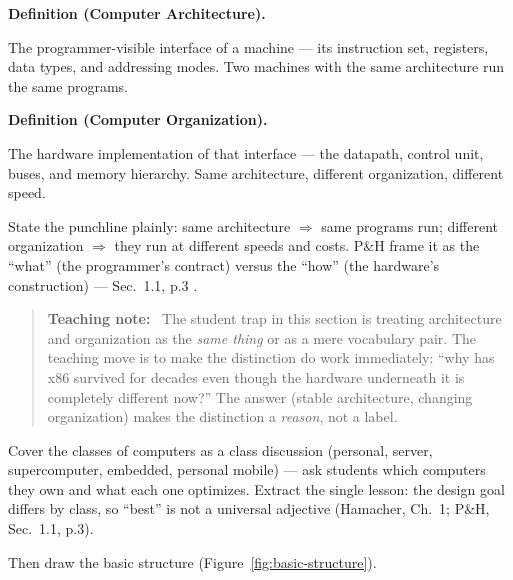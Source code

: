 \documentclass[11pt]{article}
\newenvironment{definitionbox}[1]{%
  \par\noindent\textbf{Definition (#1).}\ \itshape
}{\par\vspace{0.3em}}
\newenvironment{teachingaside}{\begin{quote}\small\color{primary-gold}\textbf{Teaching note:}\ }{\end{quote}}
\begin{document}
\begin{definitionbox}{Computer Architecture}
The programmer-visible interface of a machine --- its instruction set, registers, data types, and addressing modes. Two machines with the same architecture run the same programs.
\end{definitionbox}

\begin{definitionbox}{Computer Organization}
The hardware implementation of that interface --- the datapath, control unit, buses, and memory hierarchy. Same architecture, different organization, different speed.
\end{definitionbox}

State the punchline plainly: same architecture $\Rightarrow$ same programs run; different organization $\Rightarrow$ they run at different speeds and costs. P\&H frame it as the ``what'' (the programmer's contract) versus the ``how'' (the hardware's construction) --- Sec.~1.1, p.3 \cite{PattersonHennessy2017_computer_organization_design}.

\begin{teachingaside}
The student trap in this section is treating architecture and organization as the \emph{same thing} or as a mere vocabulary pair. The teaching move is to make the distinction do work immediately: ``why has x86 survived for decades even though the hardware underneath it is completely different now?'' The answer (stable architecture, changing organization) makes the distinction a \emph{reason}, not a label.
\end{teachingaside}

Cover the classes of computers as a class discussion (personal, server, supercomputer, embedded, personal mobile) --- ask students which computers they own and what each one optimizes. Extract the single lesson: the design goal differs by class, so ``best'' is not a universal adjective (Hamacher, Ch.~1; P\&H, Sec.~1.1, p.3).

Then draw the basic structure (Figure~\ref{fig:basic-structure}).
\end{document}
